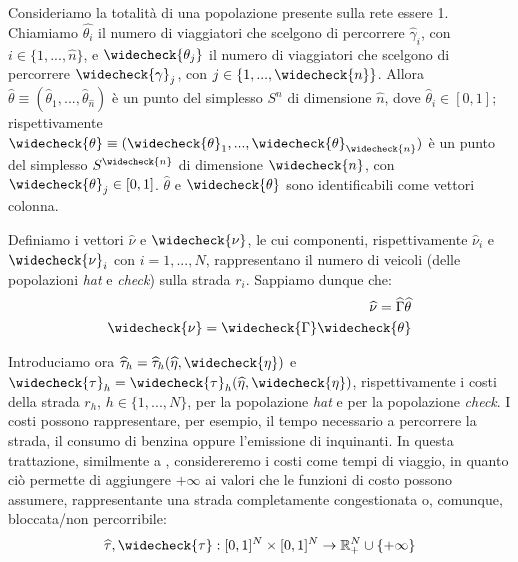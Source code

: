 Consideriamo la totalità di una popolazione presente sulla rete essere 1. Chiamiamo $\widehat{\theta_i}$ il numero
di viaggiatori che scelgono di percorrere $\widehat{\gamma}_i$, con $i\in\{1,...,\widehat{n}\}$, e $\widecheck{\theta_j}$ il numero di
viaggiatori che scelgono di percorrere $\widecheck{\gamma}_j$, con $j\in\{1,...,\widecheck{n}\}$. Allora $\widehat{\theta}\equiv(\widehat{\theta}_1,...,\widehat{\theta}_{\widehat{n}})$
è un punto del simplesso $S^{\widehat{n}}$ di dimensione $\widehat{n}$, dove $\widehat{\theta}_i\in[0,1]$; rispettivamente $\widecheck{\theta}\equiv(\widecheck{\theta}_1,...,\widecheck{\theta}_{\widecheck{n}})$
è un punto del simplesso $S^{\widecheck{n}}$ di dimensione $\widecheck{n}$, con $\widecheck{\theta}_j\in[0,1]$. $\widehat{\theta}$ e $\widecheck{\theta}$ sono identificabili
come vettori colonna.

Definiamo i vettori $\widehat{\nu}$ e $\widecheck{\nu}$, le cui componenti, rispettivamente $\widehat{\nu}_i$ e $\widecheck{\nu}_i$ con $i=1,...,N$,
rappresentano il numero di veicoli (delle popolazioni \textit{hat} e \textit{check}) sulla strada $r_i$.
Sappiamo dunque che:
\begin{equation}
    \begin{split}
    \widehat{\nu}=\widehat{\Gamma}\widehat{\theta}\\
    \widecheck{\nu}=\widecheck{\Gamma}\widecheck{\theta}
    \end{split}
    \label{eq:1}
\end{equation}

Introduciamo ora $\widehat{\tau}_h=\widehat{\tau}_h(\widehat{\eta},\widecheck{\eta})$ e $\widecheck{\tau}_h=\widecheck{\tau}_h(\widehat{\eta},\widecheck{\eta})$,
rispettivamente i costi della strada $r_h$, $h\in\{1,...,N\}$, per la popolazione \textit{hat} e per la popolazione \textit{check}. I costi possono rappresentare, per esempio,
il tempo necessario a percorrere la strada, il consumo di benzina oppure l'emissione di inquinanti. In questa trattazione, similmente a \cite{MR4911797}, considereremo i costi come tempi di viaggio,
in quanto ciò permette di aggiungere $+\infty$ ai valori che le funzioni di costo possono assumere, rappresentante una strada
completamente congestionata o, comunque, bloccata/non percorribile:
\begin{equation*}
    \widehat{\tau}, \widecheck{\tau}: [0,1]^N\times[0,1]^N \to \mathbb{R}_+^N \cup \{+\infty\}
\end{equation*}

